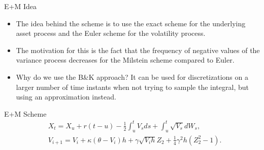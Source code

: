 \begin{frame}{E+M Idea}
    \begin{itemize}
        \item The idea behind the scheme is to use the exact scheme for the underlying asset process and the Euler scheme for the volatility process.
        \item The motivation for this is the fact that the frequency of negative values of the variance process decreases for the Milstein scheme compared to Euler.
        \item Why do we use the B\&K approach? It can be used for discretizations on a larger
        number of time instants when not trying to sample the integral, but using an approximation instead.
    \end{itemize}
\end{frame}

\begin{frame}{E+M Scheme}
    \begin{align}
        & X_{t} = X_u + r(t-u) - \frac{1}{2}\int_{u}^{t} V_s ds + \int_{u}^{t} \sqrt{V_s} dW_s, \label{EM:price}\\
        & V_{i+1} = V_i + \kappa(\theta - V_i)h + \gamma \sqrt{V_ih}Z_2 + \frac{1}{4} \gamma^2h(Z_2^2-1). \label{EM:variance} 
    \end{align}
\end{frame}